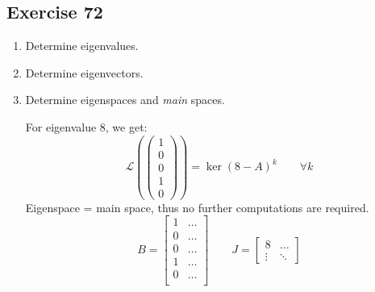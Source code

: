 \documentclass[a4paper]{article}
\theoremstyle{definition}
\begin{document}
\subsection{Exercise 72}
\begin{enumerate}
  \item Determine eigenvalues.
  \item Determine eigenvectors.
  \item Determine eigenspaces and \emph{main} spaces.

    For eigenvalue $8$, we get:
    \[ \mathcal L\left(\begin{pmatrix} 1 \\ 0 \\ 0 \\ 1 \\ 0 \end{pmatrix}\right)  = \ker(8 - A)^k \qquad \forall k \]
    Eigenspace = main space, thus no further computations are required.
    \[
      B = \begin{bmatrix}
        1 & \dots \\
        0 & \dots \\
        0 & \dots \\
        1 & \dots \\
        0 & \dots \\
      \end{bmatrix}
      \qquad
      J = \begin{bmatrix}
        8 & \dots \\
        \vdots & \ddots
      \end{bmatrix}
    \]


\end{enumerate}
\end{document}
